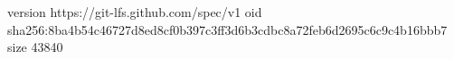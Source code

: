 version https://git-lfs.github.com/spec/v1
oid sha256:8ba4b54c46727d8ed8cf0b397c3ff3d6b3cdbc8a72feb6d2695c6c9c4b16bbb7
size 43840
